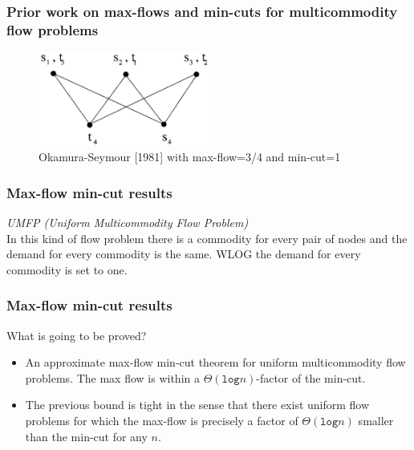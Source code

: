 \begin{frame}
\frametitle{Prior work on max-flows and min-cuts for multicommodity flow problems}
	\begin{figure}
 		\centering
    		\includegraphics[width=0.5\textwidth]{figs/3-Okamura_Seymour.png}
		\caption{Okamura-Seymour [1981] with max-flow=3/4 and min-cut=1}
	\end{figure}
\end{frame}


\begin{frame}
\frametitle{Max-flow min-cut results}
	 \textit{UMFP (Uniform Multicommodity Flow Problem)}\\
	 In this kind of flow problem there is a commodity for every pair of nodes and the demand for every commodity is the same. WLOG the demand for every commodity is set to one.
\end{frame}

\begin{frame}
\frametitle{Max-flow min-cut results}
\begin{block}{What is going to be proved?}
	\begin{itemize}
		\item An approximate max-flow min-cut theorem for uniform multicommodity flow problems. 
		The max flow is within a $\Theta (\texttt{log} n)$-factor of the min-cut. 
		\item The previous bound is tight in the sense that there exist uniform flow problems for which the max-flow is precisely a factor of $\Theta(\texttt{log}n)$ smaller than the min-cut for any $n$.
	 \end{itemize} 
\end{block}
\end{frame}


